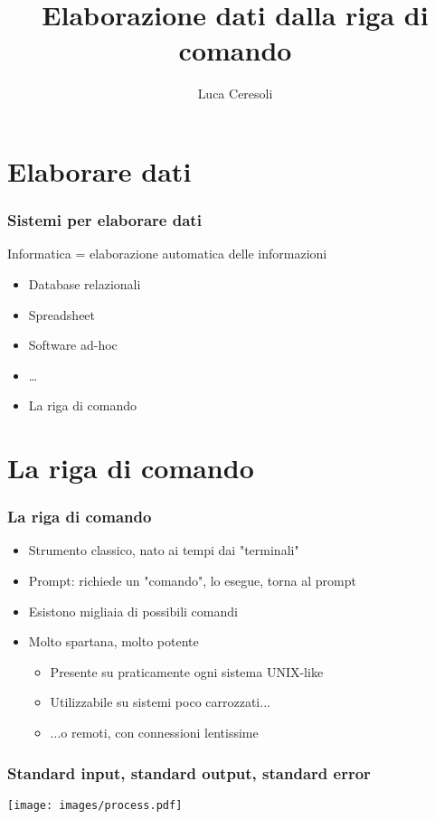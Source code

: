 \documentclass[xetex,table]{beamer}
\title{Elaborazione dati dalla riga di comando}
\author{Luca Ceresoli}
\date{}
\begin{document}
\maketitle

\section{Elaborare dati}

\begin{frame}
  \frametitle{Sistemi per elaborare dati}
  Informatica = elaborazione automatica delle informazioni
  \begin{itemize}
  \item Database relazionali
  \item Spreadsheet
  \item Software ad-hoc
  \item \dots
  \item La riga di comando
  \end{itemize}
\end{frame}

\section{La riga di comando}

\begin{frame}
  \frametitle{La riga di comando}
  \begin{itemize}
  \item Strumento classico, nato ai tempi dai "terminali"
  \item Prompt: richiede un "comando", lo esegue, torna al prompt
  \item Esistono migliaia di possibili comandi
  \item Molto spartana, molto potente
    \begin{itemize}
    \item Presente su praticamente ogni sistema UNIX-like
    \item Utilizzabile su sistemi poco carrozzati...
    \item ...o remoti, con connessioni lentissime
    \end{itemize}
  \end{itemize}
\end{frame}

\begin{frame}
  \frametitle{Standard input, standard output, standard error}
  \begin{center}
    \texttt{[image: images/process.pdf]}
  \end{center}
\end{frame}
\end{document}
